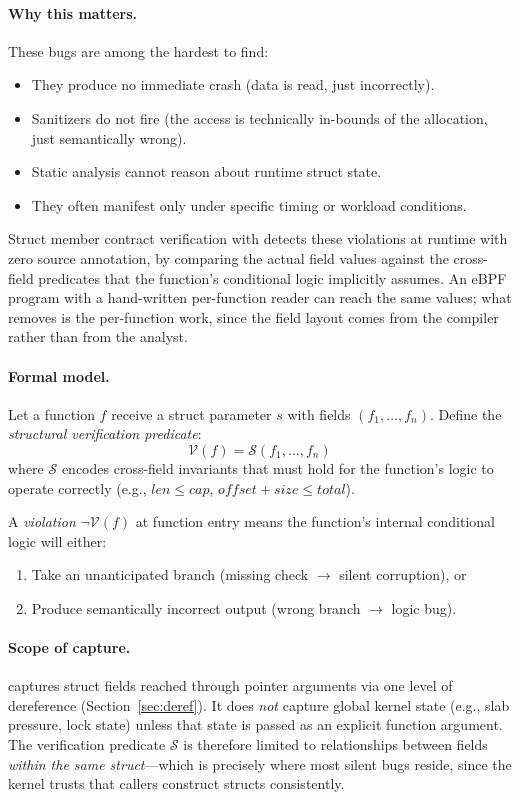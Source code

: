 \documentclass{article}
\begin{document}
\paragraph{Why this matters.} These bugs are among the hardest to find:
\begin{itemize}[nosep]
  \item They produce no immediate crash (data is read, just incorrectly).
  \item Sanitizers do not fire (the access is technically in-bounds of the
        allocation, just semantically wrong).
  \item Static analysis cannot reason about runtime struct state.
  \item They often manifest only under specific timing or workload conditions.
\end{itemize}
Struct member contract verification with \toolname{} detects these violations
at runtime with zero source annotation, by comparing the actual field values
against the cross-field predicates that the function's conditional logic
implicitly assumes. An eBPF program with a hand-written per-function reader can
reach the same values; what \toolname{} removes is the per-function work, since
the field layout comes from the compiler rather than from the analyst.

\paragraph{Formal model.}
Let a function $f$ receive a struct parameter $s$ with fields
$(f_1, \ldots, f_n)$. Define the \emph{structural verification predicate}:
$$\mathcal{V}(f) = \mathcal{S}(f_1, \ldots, f_n)$$
where $\mathcal{S}$ encodes cross-field invariants that must hold for the
function's logic to operate correctly
(e.g., $\mathit{len} \leq \mathit{cap}$,
$\mathit{offset} + \mathit{size} \leq \mathit{total}$).

\noindent A \emph{violation} $\neg\mathcal{V}(f)$ at function entry means the
function's internal conditional logic will either:
\begin{enumerate}[nosep]
  \item Take an unanticipated branch (missing check $\to$ silent corruption), or
  \item Produce semantically incorrect output (wrong branch $\to$ logic bug).
\end{enumerate}

\paragraph{Scope of capture.} \toolname{} captures struct fields reached
through pointer arguments via one level of dereference
(Section~\ref{sec:deref}). It does \emph{not} capture global kernel state
(e.g., slab pressure, lock state) unless that state is passed as an explicit
function argument. The verification predicate $\mathcal{S}$ is therefore
limited to relationships between fields \emph{within the same struct}---which
is precisely where most silent bugs reside, since the kernel trusts that
callers construct structs consistently.
\end{document}
